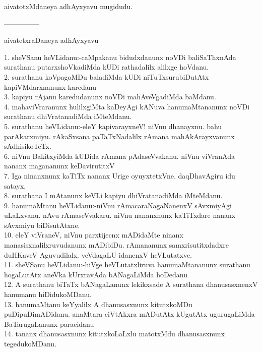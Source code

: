 \documentclass{article}
\begin{document}
\begin{center}
aivatotxMdaneya adhAyxyavu mugidudu.
\end{center}

\begin{center}
---------------
\end{center}

\begin{center}
aivatetxraDaneya adhAyxyavu
\end{center}

1. sheVSanu heVLidanu:-caMpakanu bidudxdanunx noVDi baliSaThxnAda surathanu putarxshoVkadiMda kUDi rathadalilx alilxge hoVdanu.\\
2. surathanu koVpagoMDu baladiMda kUDi niTuTxsurubiDutAtx kapiVMdarxnanunx karedanu\\
3. kapiyu rAjanu karedudanunx noVDi mahAveVgadiMda baMdanu.\\
4. mahaviVraranunx hulilxgiMta kaDeyAgi kANuva hanumaMtananunx noVDi surathanu dhiVratanadiMda iMteMdanu.\\
5. surathanu heVLidanu:-eleY kapivarayxneV! niVnu dhanayxnu. bahu parAkarxmiyu. rAkaSxsana paTaTxNadalilx rAmana mahAkArayxvanunx sAdhisikoTeTx.\\
6. niVnu BakitxyiMda kUDida rAmana pAdaseVvakanu. niVnu viVranAda nananx magananunx keDavirutitxV\\
7. Iga ninanxnunx kaTiTx nananx Urige oyuyxtetxVne. daqDhavAgiru idu satayx.\\
8. surathana I mAtanunx keVLi kapiyu dhiVratanadiMda iMteMdanu.\\
9. hanumaMtanu heVLidanu:-niVnu rAmacaraNagaNanenxV sAvxmiyAgi uLaLxvanu. nAvu rAmaseVvakaru. niVnu nananxnunx kaTiTxdare nananx sAvxmiyu biDisutAtxne.\\
10. eleY viVraneV, niVnu parxtijecnx mADidaMte ninanx manasisxnalilxruvudanunx mADibiDu. rAmananunx samxrisutitxdadxre duHKaveV Aguvudilalx. veVdagaLU idanenxV heVLutatxve.\\
11. sheVSanu heVLidanu:-hiVge heVLutatxliruva hanumaMtananunx surathanu hogaLutAtx aneVka kUrxravAda bANagaLiMda hoDedanu\\
12. A surathanu biTaTx bANagaLanunx lekikxsade A surathana dhanusasxnenxV hanumanu hiDidukoMDanu.\\
13. hanumaMtanu keYyalilx A dhanusasxnunx kitutxkoMDu puDipuDimADidanu. anaMtara ciVtAkxra mADutAtx kUgutAtx ugurugaLiMda BaTarugaLanunx paracidanu\\
14. tananx dhanusasxnunx kitutxkoLaLxlu matotxMdu dhanusasxnunx tegedukoMDanu.\\
\end{document}
